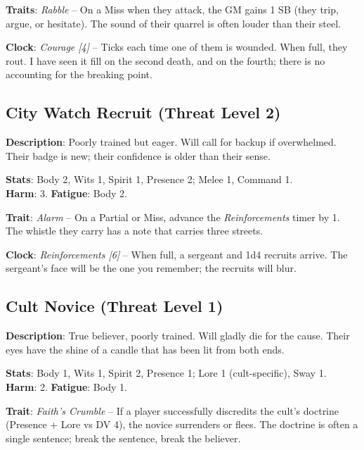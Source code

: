 \noindent\textbf{Traits}: \emph{Rabble} -- On a Miss when they attack, the GM gains 1 SB (they trip, argue, or hesitate). The sound of their quarrel is often louder than their steel.

\noindent\textbf{Clock}: \emph{Courage [4]} -- Ticks each time one of them is wounded. When full, they rout. I have seen it fill on the second death, and on the fourth; there is no accounting for the breaking point.


\subsection*{City Watch Recruit (Threat Level 2)}

\noindent\textbf{Description}: Poorly trained but eager. Will call for backup if overwhelmed. Their badge is new; their confidence is older than their sense.

\noindent\textbf{Stats}: Body 2, Wits 1, Spirit 1, Presence 2; Melee 1, Command 1.\\
\textbf{Harm}: 3. \textbf{Fatigue}: Body 2.

\noindent\textbf{Trait}: \emph{Alarm} -- On a Partial or Miss, advance the \emph{Reinforcements} timer by 1. The whistle they carry has a note that carries three streets.

\noindent\textbf{Clock}: \emph{Reinforcements [6]} -- When full, a sergeant and 1d4 recruits arrive. The sergeant's face will be the one you remember; the recruits will blur.


\subsection*{Cult Novice (Threat Level 1)}

\noindent\textbf{Description}: True believer, poorly trained. Will gladly die for the cause. Their eyes have the shine of a candle that has been lit from both ends.

\noindent\textbf{Stats}: Body 1, Wits 1, Spirit 2, Presence 1; Lore 1 (cult-specific), Sway 1.\\
\textbf{Harm}: 2. \textbf{Fatigue}: Body 1.

\noindent\textbf{Trait}: \emph{Faith's Crumble} -- If a player successfully discredits the cult's doctrine (Presence + Lore vs DV 4), the novice surrenders or flees. The doctrine is often a single sentence; break the sentence, break the believer.

